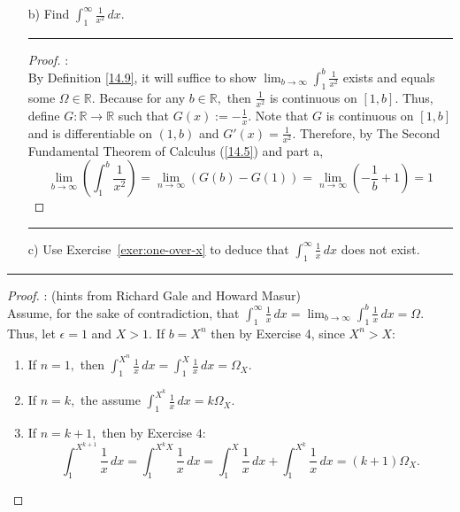 \documentclass[openany, amssymb, psamsfonts]{amsart}
\newcommand{\bbR}{\mathbb{R}}
\theoremstyle{definition}
\numberwithin{equation}{section}
\begin{document}
\begin{enumerate}
\begin{enumerate}
\vspace{4pt}     \hrule   \vspace{4pt}
		\item[b)] Find $\displaystyle \int_1^\infty \frac{1}{x^2} \,dx$.
\vspace{4pt}     \hrule   \vspace{4pt}\begin{proof}:\\
    By Definition \ref{14.9}, it will suffice to show $\displaystyle\lim_{b\to \infty}\int_1^b\frac{1}{x^2}$ exists and equals some $\Omega \in \bbR.$\newline\newline
    Because for any $b\in \bbR,$ then $\frac{1}{x^2}$ is continuous on $[1,b].$  Thus, define $G: \bbR \to \bbR$ such that $G(x) := -\frac{1}{x}.$ Note that $G$ is continuous on $[1,b]$ and is differentiable on $(1,b)$ and $G'(x) = \frac{1}{x^2}.$ Therefore, by The Second Fundamental Theorem of Calculus (\ref{14.5}) and part a, \[\lim_{b\to\infty}(\int_1^b\frac{1}{x^2}) = \lim_{n\to \infty}(G(b) - G(1)) = \lim_{n\to \infty}(-\frac{1}{b} +1) = 1\]  
\end{proof}\vspace{4pt}     \hrule   \vspace{4pt}
		\item[c)] Use Exercise~\ref{exer:one-over-x} to deduce that $\displaystyle\int_1^\infty \frac{1}{x}\,dx$ does not exist.
	\end{enumerate}
 \vspace{4pt}     \hrule   \vspace{4pt}\begin{proof}: (hints from Richard Gale and Howard Masur)\\
     Assume, for the sake of contradiction, that $\int_1^\infty \frac{1}{x}\,dx = \displaystyle\lim_{b \to \infty}\int_1^b \frac{1}{x}\,dx = \Omega.$ Thus, let $\epsilon = 1$ and $X>1.$ If $b = X^n$ then by Exercise 4, since $X^n >X$:
\begin{enumerate}
    \item If $n = 1,$ then $\int_1^{X^n}\frac{1}{x}\,dx = \int_1^X\frac{1}{x}\,dx = \Omega_X.$
    \item If $n = k,$ the assume $\int_1^{X^k} \frac{1}{x}\,dx = k\Omega_X.$
    \item If $n = k+1,$ then by Exercise $4:$
    \[\int_1^{X^{k+1}}\frac{1}{x}\,dx = \int_1^{X^kX}\frac{1}{x}\,dx = \int_1^X\frac{1}{x}\,dx + \int_1^{X^k}\frac{1}{x}\,dx = (k+1)\Omega_X.\]
\end{enumerate}

\end{proof}
\end{enumerate}
\end{document}
